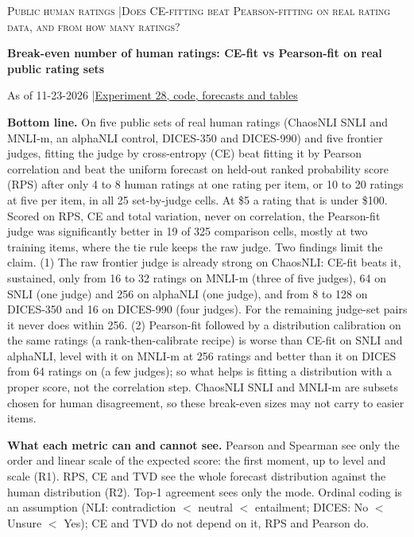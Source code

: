 \documentclass[10pt]{article}
\begin{document}
{\small\scshape Public human ratings \quad|\quad Does CE-fitting beat Pearson-fitting on real rating data, and from how many ratings?}\par
{\LARGE\bfseries Break-even number of human ratings: CE-fit vs Pearson-fit on real public rating sets}\par
{\small As of 11-23-2026 \quad|\quad \href{https://github.com/brando90/judges-dont-need-psychometrics-or-corr/tree/main/experiments/28_public_rating_sets_chaosnli_dices_frontier_judges_ce_vs_pearson_start_23Nov2026}{Experiment 28, code, forecasts and tables}}\par
\textbf{Bottom line.} On five public sets of real human ratings (ChaosNLI SNLI and MNLI-m, an alphaNLI control, DICES-350 and DICES-990) and five frontier judges, fitting the judge by cross-entropy (CE) beat fitting it by Pearson correlation and beat the uniform forecast on held-out ranked probability score (RPS) after only 4 to 8 human ratings at one rating per item, or 10 to 20 ratings at five per item, in all 25 set-by-judge cells. At \$5 a rating that is under \$100. Scored on RPS, CE and total variation, never on correlation, the Pearson-fit judge was significantly better in 19 of 325 comparison cells, mostly at two training items, where the tie rule keeps the raw judge. Two findings limit the claim. (1) The raw frontier judge is already strong on ChaosNLI: CE-fit beats it, sustained, only from 16 to 32 ratings on MNLI-m (three of five judges), 64 on SNLI (one judge) and 256 on alphaNLI (one judge), and from 8 to 128 on DICES-350 and 16 on DICES-990 (four judges). For the remaining judge-set pairs it never does within 256. (2) Pearson-fit followed by a distribution calibration on the same ratings (a rank-then-calibrate recipe) is worse than CE-fit on SNLI and alphaNLI, level with it on MNLI-m at 256 ratings and better than it on DICES from 64 ratings on (a few judges); so what helps is fitting a distribution with a proper score, not the correlation step. ChaosNLI SNLI and MNLI-m are subsets chosen for human disagreement, so these break-even sizes may not carry to easier items.

\textbf{What each metric can and cannot see.} Pearson and Spearman see only the order and linear scale of the expected score: the first moment, up to level and scale (R1). RPS, CE and TVD see the whole forecast distribution against the human distribution (R2). Top-1 agreement sees only the mode. Ordinal coding is an assumption (NLI: contradiction $<$ neutral $<$ entailment; DICES: No $<$ Unsure $<$ Yes); CE and TVD do not depend on it, RPS and Pearson do.
\end{document}
